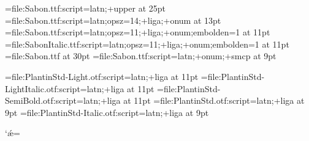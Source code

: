 
\font\displayfont=file:Sabon.ttf:script=latn;+upper at 25pt
\font\headerfont=file:Sabon.ttf:script=latn;opsz=14;+liga;+onum at 13pt
\font\decorativfont=file:Sabon.ttf:script=latn;opsz=11;+liga;+onum;embolden=1 at 11pt
\font\itdecorativfont=file:SabonItalic.ttf:script=latn;opsz=11;+liga;+onum;embolden=1 at 11pt
\font{}=file:Sabon.ttf at 30pt
\font\scshapefont=file:Sabon.ttf:script=latn;+onum;+smcp at 9pt

\font\regularfont=file:PlantinStd-Light.otf:script=latn;+liga at 11pt
\font\italicfont=file:PlantinStd-LightItalic.otf:script=latn;+liga at 11pt
\font\boldfont=file:PlantinStd-SemiBold.otf:script=latn;+liga at 11pt
\font\frfont=file:PlantinStd.otf:script=latn;+liga at 9pt
\font\rubricfont=file:PlantinStd-Italic.otf:script=latn;+liga at 9pt

\catcode`ǽ=\active
{}

\newif\ifplantin

\def\display{\plantinfalse\displayfont}
\def\header{\plantinfalse\headerfont}
\def\decorativ{\plantinfalse\decorativfont%
\def\it{\itdecorativfont}%
\def\rm{\decorativfont}}

\def\regular{\plantintrue\regularfont%
\def\it{\italicfont}%
\def\rm{\regularfont}%
\def\bf{\boldfont}}

\def\small{\plantintrue\frfont%
\def\it{\rubricfont}%
\def\rm{\frfont}%
\def\sc{\scshapefont}}
